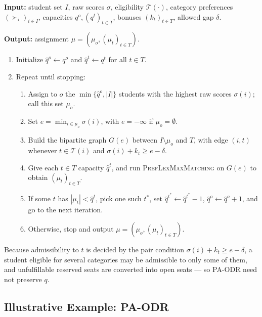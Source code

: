 \documentclass[10pt]{article}
\newcommand{\T}{\mathcal{T}}
\newcommand{\1}{\mathbf{1}}
\newcommand{\yao}[1]{{\color{blue}#1}}
\begin{document}
\begin{algorithm}[H]
\caption{Preference-Aware Overlapping De-Reservation (PA-ODR)}
\label{alg:pa-odr}
\small
\textbf{Input:} student set $I$, raw scores $\sigma$, eligibility $\T(\cdot)$, category preferences $(\succ_i)_{i\in I}$, capacities $q^o,(q^t)_{t\in T}$, bonuses $(k_t)_{t\in T}$, allowed gap $\delta$.

\textbf{Output:} assignment $\mu=(\mu_o,(\mu_t)_{t\in T})$.
\begin{enumerate}
\item Initialize $\hat q^o\leftarrow q^o$ and $\hat q^t\leftarrow q^t$ for all $t\in T$.
\item Repeat until stopping:
\begin{enumerate}
\item Assign to $o$ the $\min\{\hat q^o,|I|\}$ students with the highest raw scores $\sigma(i)$; call this set $\mu_o$.
\item Set $e=\min_{i\in\mu_o}\sigma(i)$, with $e=-\infty$ if $\mu_o=\emptyset$. 
\item Build the bipartite graph $G(e)$ between $I\setminus\mu_o$ and $T$, with edge $(i,t)$ whenever $t\in\T(i)$ and $\sigma(i)+k_t\ge e-\delta$.
\item Give each $t\in T$ capacity $\hat q^t$, and run \textsc{PrefLexMaxMatching} on $G(e)$ to obtain $(\mu_t)_{t\in T}$.
\item If some $t$ has $|\mu_t|<\hat q^t$, pick one such $t^\ast$, set $\hat q^{t^\ast}\leftarrow\hat q^{t^\ast}-1$, $\hat q^o\leftarrow\hat q^o+1$, and go to the next iteration.
\item Otherwise, stop and output $\mu=(\mu_o,(\mu_t)_{t\in T})$.
\end{enumerate}
\end{enumerate}
\end{algorithm}

Because admissibility to $t$ is decided by the pair condition $\sigma(i)+k_t\ge e-\delta$, a student eligible for several categories may be admissible to only some of them, and unfulfillable reserved seats are converted into open seats — so PA-ODR need not preserve $q$.

\subsection{Illustrative Example: PA-ODR}
\end{document}
